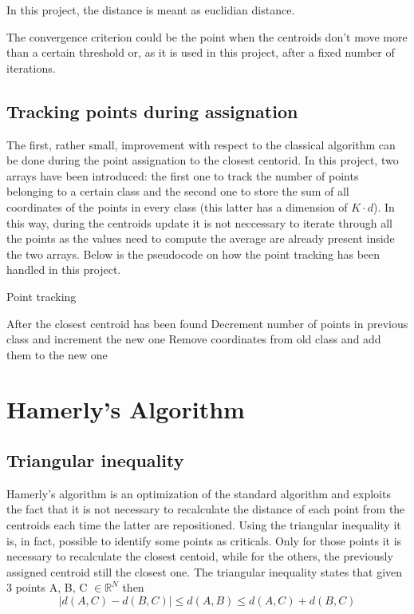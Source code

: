 \documentclass[conference]{IEEEtran}
\begin{document}
In this project, the distance is meant as euclidian distance.

The convergence criterion could be the point when the centroids don't move more than a certain threshold or, as it is used in this project, after a fixed number of iterations.

\subsection{Tracking points during assignation}
The first, rather small, improvement with respect to the classical algorithm can be done during the point assignation to the closest centorid. In this project, two arrays have been introduced: the first one to track the number of points belonging to a certain class and the second one to store the sum of all coordinates of the points in every class (this latter has a dimension of $K \cdot d$). In this way, during the centroids update it is not neccessary to iterate through all the points as the values need to compute the average are already present inside the two arrays. Below is the pseudocode on how the point tracking has been handled in this project.

\begin{algorithm}[H]
    \caption{Point tracking}
    \begin{algorithmic}
      \State After the closest centroid has been found
        \State Decrement number of points in previous class and increment the new one
        \State Remove coordinates from old class and add them to the new one
      \EndIf
    \end{algorithmic}
  \end{algorithm}
  
\section{Hamerly's Algorithm}
\subsection{Triangular inequality}
Hamerly's algorithm is an optimization of the standard algorithm and exploits the fact that it is not necessary to recalculate the distance of each point from the centroids each time the latter are repositioned. Using the triangular inequality it is, in fact, possible to identify some points as criticals. Only for those points it is necessary to recalculate the closest centoid, while for the others, the previously assigned centroid still the closest one.
The triangular inequality states that given 3 points A, B, C $\in \mathbb{R}^N$ then  
\begin{equation}
    \label{eq:triineq}
    |d(A, C) - d(B, C)| \leq d(A, B) \leq d(A, C) + d(B, C)
\end{equation}
    
\end{document}
